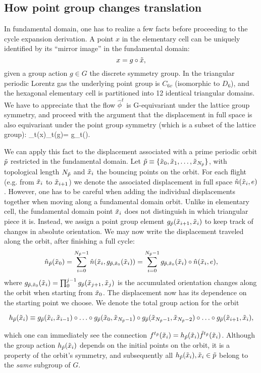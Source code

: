 \documentclass[aps,pre,
                showpacs,
                twocolumn,
                groupedaddress,
                floatfix]{revtex4-1}
\begin{document}
\subsection{How point group changes translation}


In fundamental domain, one has to realize a few facts before proceeding to the
cycle expansion derivation. A point $x$ in the elementary cell can be uniquely
identified by its ``mirror image'' in the fundamental domain:
\[
x=g\circ\tilde x,
\]
given a group action $g\in G$ the discrete symmetry group. In the triangular
periodic Lorentz gas the underlying point group is $C_{6v}$ (isomorphic to
$D_6$), and the hexagonal elementary cell is partitioned into 12 identical
triangular domains. We have to appreciate that the flow $\hat{\phi}^t$ is
G-equivariant under the lattice group symmetry, and proceed with the argument
that the displacement in full space is also equivariant under the point group
symmetry (which is a subset of the lattice group):
\beq
\hn_t(x)\equiv\hn_t(g\circ\tx)= g\circ\hn_t(\tx).
\eeq

We can apply this fact to the displacement associated with a prime periodic
orbit ${\tilde p}$ restricted in the fundamental domain. Let
${\tilde p}\equiv\{\tilde x_0,\tilde x_1,\ldots,\tilde x_{N_{\tilde p}}\}$, with topological length $N_{\tilde p}$
and $\tilde x_i$ the bouncing points on the orbit. For each flight (e.g. from $\tilde x_i$
to $\tilde x_{i+1}$) we denote the associated displacement in full space $\hat n(\tilde x_i,
e)$. However, one has to be careful when adding the individual displacements
together when moving along a fundamental domain orbit. Unlike in elementary
cell, the fundamental domain point $\tilde x_i$ does not distinguish in which
triangular piece it is. Instead, we assign a point group element
$g_{\tilde p}(\tilde x_{i+1},\tilde x_{i})$ to keep track of changes in absolute orientation. We
may now write the displacement traveled along the orbit, after finishing a full
cycle:
\[
\hat n_{{\tilde p}}(\tilde x_{0})=\sum_{i=0}^{N_{\tilde p}-1}\hat n(\tilde x_{i},g_{{\tilde p},\tilde x_0}(\tilde x_{i}))=\sum_{i=0}^{N_{\tilde p}-1}g_{{\tilde p},\tilde x_{0}}(\tilde x_{i})\circ\hat n(\tilde x_{i},e),
\]
where $g_{{\tilde p},\tilde x_{0}}(\tilde x_i)=\prod_0^{j-1} g_{\tilde p}(\tilde x_{j+1},\tilde x_{j})$ is the
accumulated orientation changes along the orbit when starting from $\tilde x_{0}$.
The displacement now has its dependence on the starting point we choose. We
denote the total group action for the orbit
\begin{widetext}
\[h_{{\tilde p}}(\tilde x_i)\equiv g_{\tilde p}(\tilde x_{i},\tilde x_{i-1})\circ\ldots\circ
g_{\tilde p}(\tilde x_{0},\tilde x_{N_{\tilde p}-1})\circ
g_{\tilde p}(\tilde x_{N_{\tilde p}-1},\tilde x_{N_{\tilde p}-2})\circ \ldots\circ
g_{\tilde p}(\tilde x_{i+1},\tilde x_{i}),\]
\end{widetext}
which one can immediately see the connection
${f^{t_{\tilde p}}(\tilde x_i)}=h_{{\tilde p}}(\tilde x_i){\tilde{f}^{t_{\tilde p}}(\tilde x_i)}$. Although the group
action $h_{{\tilde p}}(\tilde x_i)$ depends on the initial points on the orbit, it is a
property of the orbit's symmetry, and subsequently all $h_{{\tilde p}}(\tilde x_i), \tilde x_i\in
{\tilde p}$ belong to the \emph{same} subgroup of $G$.
\end{document}
